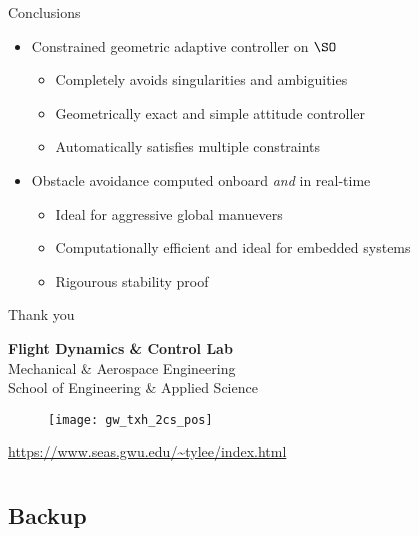 \documentclass[11pt,professionalfonts]{beamer}
\begin{document}
\begin{frame}{Conclusions} %

	\begin{itemize}
		\item Constrained geometric adaptive controller on \( \SO \)
		\begin{itemize}
			\item Completely avoids singularities and ambiguities 
			\item Geometrically exact and simple attitude controller
			\item Automatically satisfies multiple constraints 
		\end{itemize}
		\pause
		\item Obstacle avoidance computed onboard \emph{and} in real-time
		\begin{itemize}
			\item Ideal for aggressive global manuevers
			\item Computationally efficient and ideal for embedded systems 
			\item Rigourous stability proof 
		\end{itemize}
	\end{itemize}

\end{frame}   %

\begin{frame}[c]{Thank you}
	\centering
	
	\textbf{\large Flight Dynamics \& Control Lab} \\
	Mechanical \& Aerospace Engineering \\
	School of Engineering \& Applied Science
	
	\begin{figure} %
       	\texttt{[image: gw\_txh\_2cs\_pos]}
  	\end{figure}
	
	\url{https://www.seas.gwu.edu/~tylee/index.html}
\end{frame}

\section*{}
\subsection*{Backup}
\end{document}
